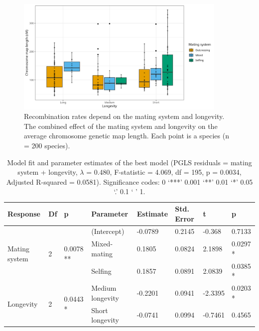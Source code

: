 \documentclass{article}
\begin{document}
\begin{figure}[h!]
  \includegraphics[width=0.9\textwidth]{figures/Fig2.jpeg}
  \centering
  \caption{Recombination rates depend on the mating system and longevity. The combined effect of the mating system and longevity on the average chromosome genetic map length. Each point is a species (n = 200 species).
  }
  \label{figure:Fig2}
\end{figure}


\begin{table}[h!]
\centering{}
\caption{Model fit and parameter estimates of the best model (PGLS residuals = mating system + longevity, $\lambda$ = 0.480, F-statistic = 4.069, df = 195, p = 0.0034, Adjusted R-squared = 0.0581). Significance codes: 0 ‘***’ 0.001 ‘**’ 0.01 ‘*’ 0.05 ‘.’ 0.1 ‘ ’ 1.}
\begin{tabular}{llllllll}
Response                       & Df                 & p                       & Parameter        & Estimate & Std. Error & t       & p      \\ \hline
\multirow{3}{*}{Mating system} & \multirow{3}{*}{2} & \multirow{3}{*}{0.0078 **} & (Intercept)      & -0.0789  & 0.2145     & -0.368  & 0.7133 \\ \cline{4-8} 
                               &                    &                         & Mixed-mating     & 0.1805   & 0.0824     & 2.1898  & 0.0297 * \\
                               &                    &                         & Selfing          & 0.1857   & 0.0891     & 2.0839  & 0.0385 * \\ \cline{4-8} 
\multirow{2}{*}{Longevity}     & \multirow{2}{*}{2} & \multirow{2}{*}{0.0443 *} & Medium longevity & -0.2201  & 0.0941     & -2.3395 & 0.0203 * \\
                               &                    &                         & Short longevity  & -0.0741  & 0.0994     & -0.7461 & 0.4565
\end{tabular}
\label{table:table2}
\end{table}
\end{document}
